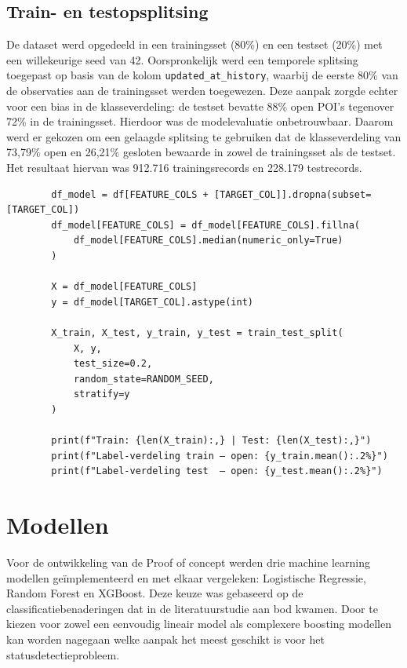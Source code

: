 \subsection{Train- en testopsplitsing}
De dataset werd opgedeeld in een trainingsset (80\%) en een testset (20\%) met een willekeurige seed van 42. Oorspronkelijk werd een temporele splitsing toegepast op basis van de kolom \texttt{updated\_at\_history}, waarbij de eerste 80\% van de observaties aan de trainingsset werden toegewezen. Deze aanpak zorgde echter voor een bias in de klasseverdeling: de testset bevatte 88\% open POI's tegenover 72\% in de trainingsset. Hierdoor was de modelevaluatie onbetrouwbaar. Daarom werd er gekozen om een gelaagde splitsing te gebruiken dat de klasseverdeling van 73,79\% open en 26,21\% gesloten bewaarde in zowel 
de trainingsset als de testset. Het resultaat hiervan was 912.716 trainingsrecords en 228.179 testrecords.

\begin{listing}[H]
    \begin{verbatim}
        df_model = df[FEATURE_COLS + [TARGET_COL]].dropna(subset=[TARGET_COL])
        df_model[FEATURE_COLS] = df_model[FEATURE_COLS].fillna(
            df_model[FEATURE_COLS].median(numeric_only=True)
        )
        
        X = df_model[FEATURE_COLS]
        y = df_model[TARGET_COL].astype(int)
        
        X_train, X_test, y_train, y_test = train_test_split(
            X, y,
            test_size=0.2,
            random_state=RANDOM_SEED,
            stratify=y
        )
        
        print(f"Train: {len(X_train):,} | Test: {len(X_test):,}")
        print(f"Label-verdeling train — open: {y_train.mean():.2%}")
        print(f"Label-verdeling test  — open: {y_test.mean():.2%}")
    \end{verbatim}
    \caption[Train- en testopsplitsing]{Gelaagde opsplitsing van de dataset in een trainingsset van 80\% en een testset van 20\%.}
\end{listing}

\section{Modellen}
Voor de ontwikkeling van de Proof of concept werden drie machine learning modellen geïmplementeerd en met elkaar vergeleken: Logistische Regressie, Random Forest en XGBoost. Deze keuze was gebaseerd op de classificatiebenaderingen dat in de literatuurstudie aan bod kwamen. Door te kiezen voor zowel een eenvoudig lineair model als complexere boosting modellen kan worden nagegaan welke aanpak het meest geschikt is voor het statusdetectieprobleem.

